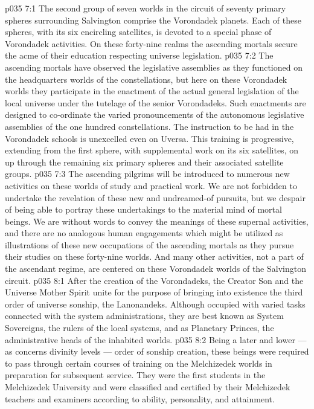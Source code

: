 \vs p035 7:1 The second group of seven worlds in the circuit of seventy primary spheres surrounding Salvington comprise the Vorondadek planets. Each of these spheres, with its six encircling satellites, is devoted to a special phase of Vorondadek activities. On these forty\hyp{}nine realms the ascending mortals secure the acme of their education respecting universe legislation.
\vs p035 7:2 The ascending mortals have observed the legislative assemblies as they functioned on the headquarters worlds of the constellations, but here on these Vorondadek worlds they participate in the enactment of the actual general legislation of the local universe under the tutelage of the senior Vorondadeks. Such enactments are designed to co\hyp{}ordinate the varied pronouncements of the autonomous legislative assemblies of the one hundred constellations. The instruction to be had in the Vorondadek schools is unexcelled even on Uversa. This training is progressive, extending from the first sphere, with supplemental work on its six satellites, on up through the remaining six primary spheres and their associated satellite groups.
\vs p035 7:3 The ascending pilgrims will be introduced to numerous new activities on these worlds of study and practical work. We are not forbidden to undertake the revelation of these new and undreamed\hyp{}of pursuits, but we despair of being able to portray these undertakings to the material mind of mortal beings. We are without words to convey the meanings of these supernal activities, and there are no analogous human engagements which might be utilized as illustrations of these new occupations of the ascending mortals as they pursue their studies on these forty\hyp{}nine worlds. And many other activities, not a part of the ascendant regime, are centered on these Vorondadek worlds of the Salvington circuit.
\vs p035 8:1 After the creation of the Vorondadeks, the Creator Son and the Universe Mother Spirit unite for the purpose of bringing into existence the third order of universe sonship, the Lanonandeks. Although occupied with varied tasks connected with the system administrations, they are best known as System Sovereigns, the rulers of the local systems, and as Planetary Princes, the administrative heads of the inhabited worlds.
\vs p035 8:2 Being a later and lower --- as concerns divinity levels --- order of sonship creation, these beings were required to pass through certain courses of training on the Melchizedek worlds in preparation for subsequent service. They were the first students in the Melchizedek University and were classified and certified by their Melchizedek teachers and examiners according to ability, personality, and attainment.
